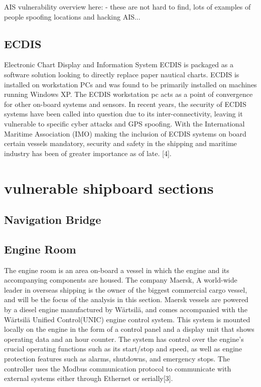 \documentclass{report}
\begin{document}
AIS vulnerability overview here:
- these are not hard to find, lots of examples of people spoofing locations and hacking AIS...


\section{ECDIS}

Electronic Chart Display and Information System ECDIS is packaged as a software solution looking to directly replace paper nautical charts. ECDIS is installed on workstation PCs and was found to be primarily installed on machines running Windows XP. The ECDIS workstation pc acts as a point of convergence for other on-board systems and sensors. In recent years, the security of ECDIS systems have been called into question due to its inter-connectivity, leaving it vulnerable to specific cyber attacks and GPS spoofing. With the International Maritime Association (IMO) making the inclusion of ECDIS systems on board certain vessels mandatory, security and safety in the shipping and maritime industry has been of greater importance as of late. [4]. 




\chapter{vulnerable shipboard sections}

\section{Navigation Bridge}
 





\section{Engine Room}
The engine room is an area on-board a vessel in which the engine and its accompanying components are housed. The company Maersk, A world-wide leader in overseas shipping is the owner of the biggest commercial cargo vessel, and will be the focus of the analysis in this section. Maersk vessels are powered by a diesel engine manufactured by Wärtsilä, and comes accompanied with the Wärtsilä Unified Control(UNIC) engine control system. This system is mounted locally on the engine in the form of a control panel and a display unit that shows operating data and an hour counter. The system has control over the engine's crucial operating functions such as its start/stop and  speed, as well as engine protection features such as alarms, shutdowns, and emergency stops. The controller uses the Modbus communication protocol to communicate with external systems either through Ethernet or serially[3]. 
\end{document}
